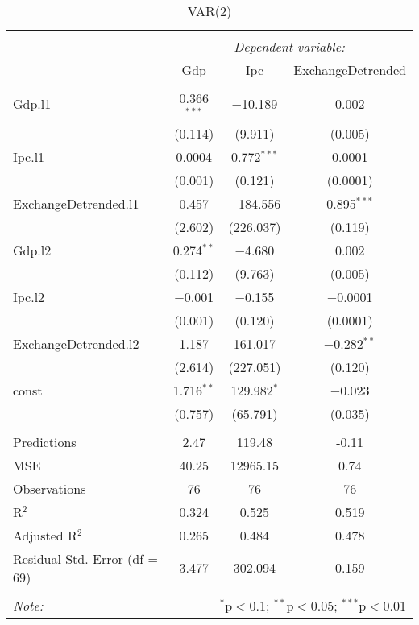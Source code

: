 
\begin{table}[H] \centering 
  \caption{VAR(2)} 
  \label{tb:var_2} 
\begin{tabular}{@{\extracolsep{5pt}}lccc} 
\\[-1.8ex]\hline 
\hline \\[-1.8ex] 
 & \multicolumn{3}{c}{\textit{Dependent variable:}} \\ 
\cline{2-4} 
 & Gdp & Ipc & ExchangeDetrended \\ 
\hline \\[-1.8ex] 
 Gdp.l1 & 0.366$^{***}$ & $-$10.189 & 0.002 \\ 
  & (0.114) & (9.911) & (0.005) \\ 
  Ipc.l1 & 0.0004 & 0.772$^{***}$ & 0.0001 \\ 
  & (0.001) & (0.121) & (0.0001) \\ 
  ExchangeDetrended.l1 & 0.457 & $-$184.556 & 0.895$^{***}$ \\ 
  & (2.602) & (226.037) & (0.119) \\ 
  Gdp.l2 & 0.274$^{**}$ & $-$4.680 & 0.002 \\ 
  & (0.112) & (9.763) & (0.005) \\ 
  Ipc.l2 & $-$0.001 & $-$0.155 & $-$0.0001 \\ 
  & (0.001) & (0.120) & (0.0001) \\ 
  ExchangeDetrended.l2 & 1.187 & 161.017 & $-$0.282$^{**}$ \\ 
  & (2.614) & (227.051) & (0.120) \\ 
  const & 1.716$^{**}$ & 129.982$^{*}$ & $-$0.023 \\ 
  & (0.757) & (65.791) & (0.035) \\ 
 \hline \\[-1.8ex] 
Predictions & 2.47 & 119.48 & -0.11 \\ 
MSE & 40.25 & 12965.15 & 0.74 \\ 
Observations & 76 & 76 & 76 \\ 
R$^{2}$ & 0.324 & 0.525 & 0.519 \\ 
Adjusted R$^{2}$ & 0.265 & 0.484 & 0.478 \\ 
Residual Std. Error (df = 69) & 3.477 & 302.094 & 0.159 \\ 
\hline 
\hline \\[-1.8ex] 
\textit{Note:}  & \multicolumn{3}{r}{$^{*}$p$<$0.1; $^{**}$p$<$0.05; $^{***}$p$<$0.01} \\ 
\end{tabular} 
\end{table} 
